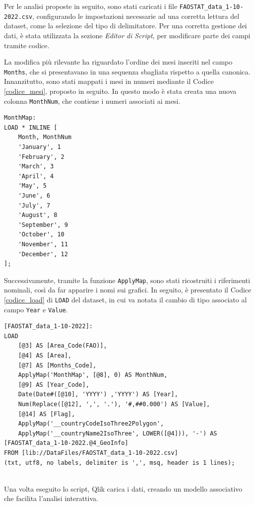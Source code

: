 Per le analisi proposte in seguito, sono stati caricati i file \texttt{FAOSTAT\_data\_1-10-2022.csv}, configurando le impostazioni necessarie ad una corretta lettura del dataset, come la selezione del tipo di delimitatore. Per una corretta gestione dei dati, è stata utilizzata la sezione \textit{Editor di Script}, per modificare parte dei campi tramite codice.

La modifica più rilevante ha riguardato l'ordine dei mesi inseriti nel campo \texttt{Months}, che si presentavano in una sequenza sbagliata rispetto a quella canonica. Innanzitutto, sono stati mappati i mesi in numeri mediante il Codice \ref{codice_mesi}, proposto in seguito. In questo modo è stata creata una nuova colonna \texttt{MonthNum}, che contiene i numeri associati ai mesi.
\newpage
\begin{lstlisting}[language=Qlik, caption={Mapping dei mesi}, captionpos=b]
MonthMap:
LOAD * INLINE [
    Month, MonthNum
    'January', 1
    'February', 2
    'March', 3
    'April', 4
    'May', 5
    'June', 6
    'July', 7
    'August', 8
    'September', 9
    'October', 10
    'November', 11
    'December', 12
];
\end{lstlisting}
\label{codice_mesi}

Successivamente, tramite la funzione \texttt{ApplyMap}, sono stati ricostruiti i riferimenti nominali, così da far apparire i nomi sui grafici.
In seguito, è presentato il Codice \ref{codice_load} di \texttt{LOAD} del dataset, in cui va notata il cambio di tipo associato al campo \texttt{Year} e \texttt{Value}.

\begin{lstlisting}[language=Qlik, caption={Caricamento dati FAOSTAT in Qlik}, captionpos=b]
 [FAOSTAT_data_1-10-2022]:
LOAD
    [@3] AS [Area_Code(FAO)],
    [@4] AS [Area],
    [@7] AS [Months_Code],
    ApplyMap('MonthMap', [@8], 0) AS MonthNum,
    [@9] AS [Year_Code],
    Date(Date#([@10], 'YYYY') ,'YYYY') AS [Year],
    Num(Replace([@12], ',', '.'), '#,##0.000') AS [Value],
    [@14] AS [Flag],
    ApplyMap('__countryCodeIsoThree2Polygon', 
    ApplyMap('__countryName2IsoThree', LOWER([@4])), '-') AS [FAOSTAT_data_1-10-2022.@4_GeoInfo]
FROM [lib://DataFiles/FAOSTAT_data_1-10-2022.csv]
(txt, utf8, no labels, delimiter is ',', msq, header is 1 lines);
 
\end{lstlisting}
\label{codice_load}

Una volta eseguito lo script, Qlik carica i dati, creando un modello associativo che
facilita l'analisi interattiva.

